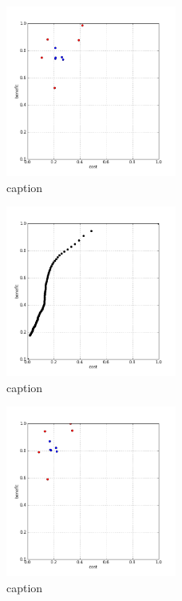 %
\begin{figure}[!ht]
	\centering
	\includegraphics[width=0.5\textwidth]{img/p1figs/computeFrameStateAnders_sectionCompareBetter_smooth0_tol12.png}
	\caption{caption}
\end{figure}
%
\begin{figure}[!ht]
	\centering
	\includegraphics[width=0.5\textwidth]{img/p1figs/computeFrameStateAnders_sectionCompareBetter_smooth0_tol12_AUC.png}
	\caption{caption}
\end{figure}
%
\begin{figure}[!ht]
	\centering
	\includegraphics[width=0.5\textwidth]{img/p1figs/computeFrameStateAnders_sectionCompareBetter_smooth0_tol24.png}
	\caption{caption}
\end{figure}
